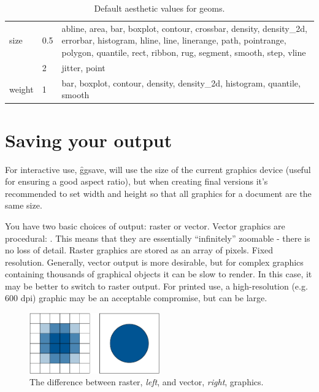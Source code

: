 \begin{table}
\begin{center}
\begin{tabular}{llp{4in}}
    size & 0.5       & abline, area, bar, boxplot, contour, crossbar, density, density\_2d, errorbar, histogram, hline, line, linerange, path, pointrange, polygon, quantile, rect, ribbon, rug, segment, smooth, step, vline\\
     & 2         & jitter, point                                                                                                                                                                                        \\
    weight & 1       & bar, boxplot, contour, density, density\_2d, histogram, quantile, smooth                                                                                                                              \\
  \bottomrule
  \end{tabular}
  \end{center}
  \caption{Default aesthetic values for geoms.  }
  \label{tab:}
\end{table}


% 


\section{Saving your output}
\label{sec:saving}

For interactive use, \f{ggsave}, will use the size of the current graphics device (useful for ensuring a good aspect ratio), but when creating final versions it's recommended to set width and height so that all graphics for a document are the same size.

You have two basic choices of output: raster or vector.  Vector graphics are procedural: .  This means that they are essentially ``infinitely'' zoomable - there is no loss of detail.  Raster graphics are stored as an array of pixels.  Fixed resolution.  Generally, vector output is more desirable, but for complex graphics containing thousands of graphical objects it can be slow to render.  In this case, it may be better to switch to raster output.  For printed use, a high-resolution (e.g. 600 dpi) graphic may be an acceptable compromise, but can be large.


\begin{figure}[htbp]
  \centering
    \includegraphics[width= 0.5\textwidth]{vector-raster}
  \caption{The difference between raster, {\it left}, and vector, {\it right}, graphics. }
  \label{fig:vector-raster}
\end{figure}

